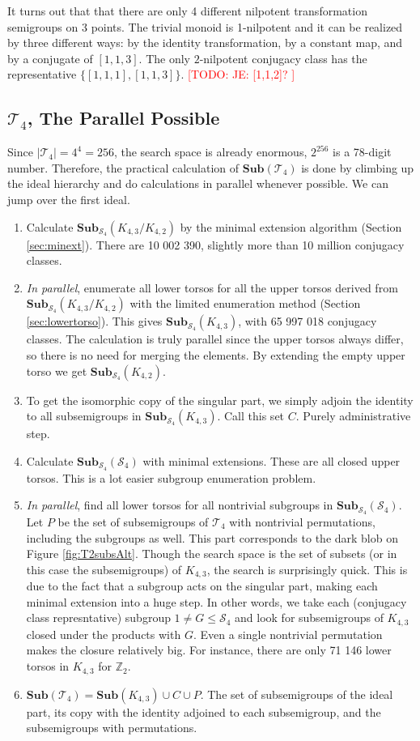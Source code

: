 \documentclass{amsart}
\newcommand{\cT}{{\mathcal T}}
\newcommand{\cS}{{\mathcal S}}
\newcommand{\Sub}{\mathbf{Sub}}
\newcommand{\todo}[1]{\textcolor{red}{ \small \textsf{[TODO:  #1 ]} \normalsize}}
\theoremstyle{plain}
\theoremstyle{definition}
\begin{document}
It turns out that that there are only 4 different nilpotent transformation semigroups on 3 points.
The trivial monoid is 1-nilpotent and it can be realized by three different ways: by the identity transformation, by a constant map, and by a conjugate of $[1,1,3]$.
The only $2$-nilpotent conjugacy class has the representative $\{[1,1,1],[1,1,3]\}$. \todo{JE: [1,1,2]?}

\subsection{$\cT_4$, The Parallel Possible }
Since $|\cT_4|=4^4=256$, the search space is already enormous, $2^{256}$ is a 78-digit number.
Therefore, the practical calculation of  $\Sub(\cT_4)$ is done by climbing up the ideal hierarchy and do calculations in parallel whenever possible.
We can jump over the first ideal.

\begin{enumerate}
\item Calculate $\Sub_{\cS_4}(K_{4,3}/K_{4,2})$ by the minimal extension algorithm (Section \ref{sec:minext}). There are 10 002 390, slightly more than 10 million conjugacy classes.  
\item \emph{In parallel}, enumerate all lower torsos for all the upper torsos derived from  $\Sub_{\cS_4}(K_{4,3}/K_{4,2})$ with the limited enumeration method (Section \ref{sec:lowertorso}). This gives $\Sub_{\cS_4}(K_{4,3})$, with  65 997 018 conjugacy classes. The calculation is truly parallel since the upper torsos always differ, so there is no need for merging the elements. By extending the empty upper torso we get $\Sub_{\cS_4}(K_{4,2})$.
\item To get the isomorphic copy of the singular part, we simply adjoin the identity to all subsemigroups in $\Sub_{\cS_4}(K_{4,3})$. Call this set $C$.
Purely administrative step.
\item Calculate $\Sub_{\cS_4}(\cS_4)$ with minimal extensions. These are all closed upper torsos. This is a lot easier subgroup enumeration problem.
\item \emph{In parallel}, find all lower torsos for all nontrivial subgroups in $\Sub_{\cS_4}(\cS_4)$. Let $P$ be the set of subsemigroups of $\cT_4$ with nontrivial permutations, including the subgroups as well. This part corresponds to the dark blob on Figure \ref{fig:T2subsAlt}.
Though the search space is the set of subsets (or in this case the subsemigroups) of $K_{4,3}$, the search is surprisingly quick.
This is due to the fact that a subgroup acts on the singular part, making each minimal extension into a huge step.
In other words, we take each (conjugacy class represntative) subgroup $1\neq G\leq \cS_4$ and look for subsemigroups of $K_{4,3}$ closed under the products with $G$.
Even a single nontrivial permutation makes the closure relatively big.
For instance, there are only 71 146 lower torsos in $K_{4,3}$ for $\mathbb{Z}_2$.
\item $\Sub(\cT_4)=\Sub(K_{4,3})\cup C \cup P$. The set of subsemigroups of the ideal part, its copy with the identity adjoined to each subsemigroup, and the subsemigroups with permutations.
\end{enumerate}
\end{document}
